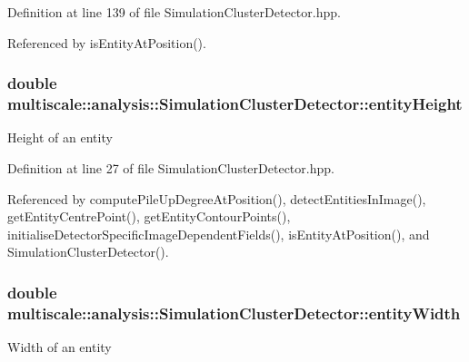 Definition at line 139 of file Simulation\-Cluster\-Detector.\-hpp.



Referenced by is\-Entity\-At\-Position().

\hypertarget{classmultiscale_1_1analysis_1_1SimulationClusterDetector_a2ba5c2738d32f71ccaacba4129b7bcfc}{
\subsubsection[{entity\-Height}]{\setlength{\rightskip}{0pt plus 5cm}double multiscale\-::analysis\-::\-Simulation\-Cluster\-Detector\-::entity\-Height\hspace{0.3cm}{\ttfamily [private]}}}\label{classmultiscale_1_1analysis_1_1SimulationClusterDetector_a2ba5c2738d32f71ccaacba4129b7bcfc}
Height of an entity 

Definition at line 27 of file Simulation\-Cluster\-Detector.\-hpp.



Referenced by compute\-Pile\-Up\-Degree\-At\-Position(), detect\-Entities\-In\-Image(), get\-Entity\-Centre\-Point(), get\-Entity\-Contour\-Points(), initialise\-Detector\-Specific\-Image\-Dependent\-Fields(), is\-Entity\-At\-Position(), and Simulation\-Cluster\-Detector().

\hypertarget{classmultiscale_1_1analysis_1_1SimulationClusterDetector_a9212da88b787b8f9791f27d913b6d05d}{
\subsubsection[{entity\-Width}]{\setlength{\rightskip}{0pt plus 5cm}double multiscale\-::analysis\-::\-Simulation\-Cluster\-Detector\-::entity\-Width\hspace{0.3cm}{\ttfamily [private]}}}\label{classmultiscale_1_1analysis_1_1SimulationClusterDetector_a9212da88b787b8f9791f27d913b6d05d}
Width of an entity 

